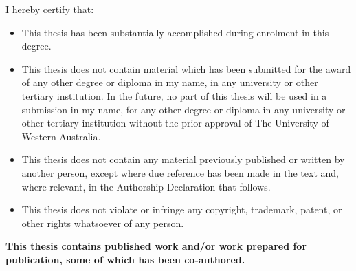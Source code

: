 
\begin{declaration}


I hereby certify that:
\begin{itemize}
	\item This thesis has been substantially accomplished during enrolment in this degree.
	\item This thesis does not contain material which has been submitted for the award of any other degree or diploma in my name, in any university or other tertiary institution.
	In the future, no part of this thesis will be used in a submission in my name, for any other degree or diploma in any university or other tertiary institution without the prior approval of The University of Western Australia.
	\item This thesis does not contain any material previously published or written by another person, except where due reference has been made in the text and, where relevant, in the Authorship Declaration that follows. 
	\item This thesis does not violate or infringe any copyright, trademark, patent, or other rights whatsoever of any person.
\end{itemize}

\textbf{This thesis contains published work and/or work prepared for publication, some of which has been co-authored. }


\end{declaration}

